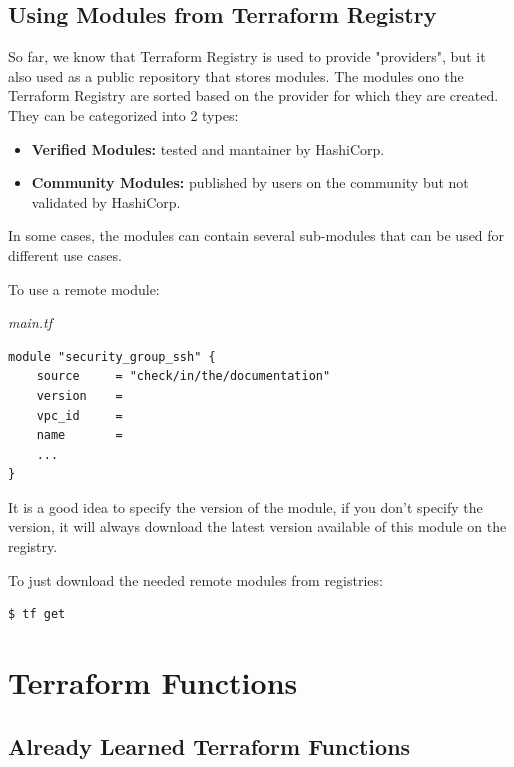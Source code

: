\documentclass{article}
\newenvironment{blocktemplateII}[1]{%
    \tcolorbox[beamer,%
    noparskip,breakable,
    colframe=Green,%
    colbacklower=LimeGreen!75!LightGreen,%
    title=#1]}%
    {\endtcolorbox}
\newenvironment{codetemplate}[1][]{%
  \mybasecolorbox[#1]
  \itshape
}{%
  \endmybasecolorbox
}
\begin{document}
\subsection{Using Modules from Terraform Registry}

So far, we know that Terraform Registry is used to provide "providers", but it also used as a public repository that stores modules. The modules ono the Terraform Registry are sorted based on the provider for which they are created. They can be categorized into 2 types:
\begin{itemize}
    \item \textbf{Verified Modules:} tested and mantainer by HashiCorp.
    \item \textbf{Community Modules:} published by users on the community but not validated by HashiCorp.
\end{itemize} 

In some cases, the modules can contain several sub-modules that can be used for different use cases.

To use a remote module:

\begin{codetemplate}{main.tf}
\begin{verbatim}
module "security_group_ssh" {
    source     = "check/in/the/documentation"
    version    = 
    vpc_id     =
    name       = 
    ...
}
\end{verbatim}
\end{codetemplate}

\begin{blocktemplateII}{Note}
It is a good idea to specify the version of the module, if you don't specify the version, it will always download the latest version available of this module on the registry.
\end{blocktemplateII}

To just download the needed remote modules from registries:

\begin{codetemplate}{}
\begin{verbatim}
$ tf get
\end{verbatim}
\end{codetemplate}

\section{Terraform Functions}

\subsection{Already Learned Terraform Functions}
\end{document}
